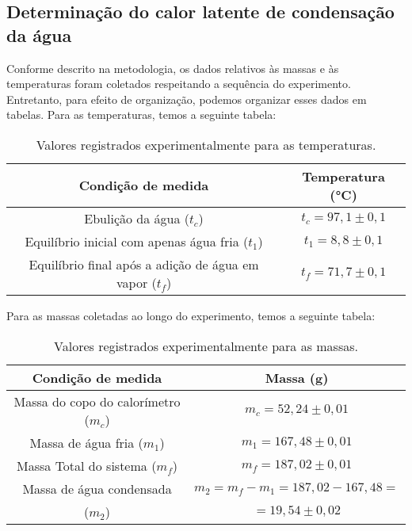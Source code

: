 \subsection{Determinação do calor latente de condensação da água}

Conforme descrito na metodologia, os dados relativos às massas e às temperaturas foram coletados respeitando a sequência do experimento. Entretanto, para efeito de organização, podemos organizar esses dados em tabelas. Para as temperaturas, temos a seguinte tabela:

\begin{table}[H]
    \centering
    \begin{tabular}{ |c||c| }
        \hline
        \textbf{Condição de medida} & \textbf{Temperatura (°C)}\\
        \hline 
        Ebulição da água ($t_c$)  & $t_c = 97,1 \pm 0,1$ \\
        Equilíbrio inicial com apenas água fria ($t_1$) & $t_1 = 8,8 \pm 0,1$  \\  
        Equilíbrio final após a adição de água em vapor ($t_f$) & $t_f = 71,7 \pm 0,1$  \\
        \hline
        \end{tabular}
    \caption{Valores registrados experimentalmente para as temperaturas.} 
\end{table}

Para as massas coletadas ao longo do experimento, temos a seguinte tabela:

\begin{table}[H]
    \centering
    \begin{tabular}{ |c||c| }
        \hline
        \textbf{Condição de medida} & \textbf{Massa (g)}\\
        \hline 
        Massa do copo do calorímetro  ($m_c$)  & $m_c = 52,24 \pm 0,01$ \\
        Massa de água fria  ($m_1$) & $m_1 = 167,48 \pm 0,01$  \\  
        Massa Total do sistema ($m_f$) & $m_f = 187,02 \pm 0,01$  \\
        Massa de água condensada & $m_2 = m_f - m_1 = 187,02 - 167,48 = $  \\
        ($m_2$)& $= 19,54 \pm 0,02$\\
        \hline
        \end{tabular}
    \caption{Valores registrados experimentalmente para as massas.} 
\end{table}

